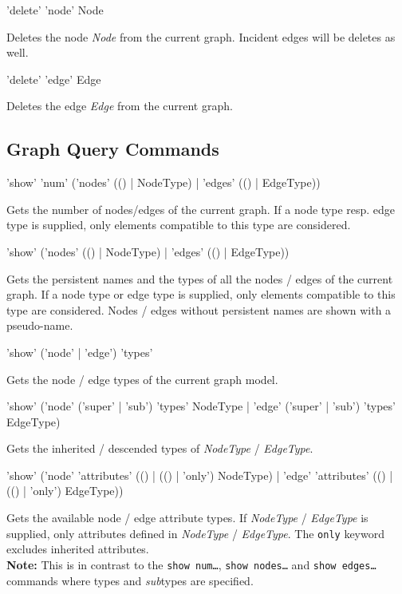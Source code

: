 \begin{rail}
  'delete' 'node' Node
\end{rail}
Deletes the node \emph{Node} from the current graph. Incident edges will be deletes as well.

\begin{rail}
  'delete' 'edge' Edge
\end{rail}
Deletes the edge \emph{Edge} from the current graph.  
  
\subsection{Graph Query Commands}

\begin{rail}
  'show' 'num' ('nodes' (() | NodeType) | 'edges' (() | EdgeType))
\end{rail}
Gets the number of nodes/edges of the current graph. If a node type resp. edge type is supplied, only elements compatible to this type are considered.

\begin{rail}
  'show' ('nodes' (() | NodeType) | 'edges' (() | EdgeType))
\end{rail}
Gets the persistent names and the types of all the nodes / edges of the current graph. If a node type or edge type is supplied, only elements compatible to this type are considered. Nodes / edges without persistent names are shown with a pseudo-name.

\begin{rail}
  'show' ('node' | 'edge') 'types'
\end{rail}
Gets the node / edge types of the current graph model.

\begin{rail}
'show' ('node' ('super' | 'sub') 'types' NodeType | 'edge' ('super' | 'sub') 'types' EdgeType)
\end{rail}
Gets the inherited / descended types of \emph{NodeType} / \emph{EdgeType}.

\begin{rail}
  'show' ('node' 'attributes' (() | (() | 'only') NodeType) | 'edge' 'attributes' (() | (() | 'only') EdgeType))
\end{rail}
Gets the available node / edge attribute types. If \emph{NodeType} / \emph{EdgeType} is supplied, only attributes defined in \emph{NodeType} / \emph{EdgeType}. The \texttt{only} keyword excludes inherited attributes.\\
\textbf{Note:} This is in contrast to the \texttt{show num\dots}, \texttt{show nodes\dots} and \texttt{show edges\dots} commands where types and \emph{sub}types are specified.

